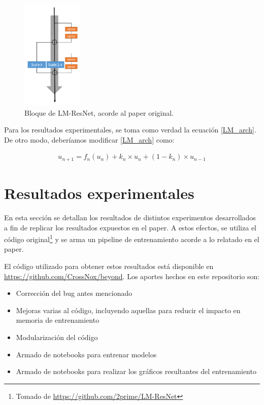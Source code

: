 \documentclass[titlepage,a4paper,oneside]{article}
\begin{document}
\begin{figure}[H]
\centering
\includegraphics[height=200px]{images/LM-Block-orig.png}
\caption{Bloque de LM-ResNet, acorde al paper original.}
\label{lmblockorig}
\end{figure}

Para los resultados experimentales, se toma como verdad la ecuación \ref{LM_arch}. De otro modo, deberíamos modificar \ref{LM_arch} como:

\begin{align}
	u_{n+1} = f_n(u_n) + k_n \times u_n + (1-k_n) \times u_{n-1}
\end{align}

\section{Resultados experimentales}
En esta sección se detallan los resultados de distintos experimentos desarrollados a fin de replicar los resultados expuestos en el paper. A estos efectos, se utiliza el código original\footnote{Tomado de \url{https://github.com/2prime/LM-ResNet}} y se arma un pipeline de entrenamiento acorde a lo relatado en el paper.

El código utilizado para obtener estos resultados está disponible en \url{https://github.com/CrossNox/beyond}. Los aportes hechos en este repositorio son:

\begin{itemize}
	\item Corrección del bug antes mencionado
	\item Mejoras varias al código, incluyendo aquellas para reducir el impacto en memoria de entrenamiento
	\item Modularización del código
	\item Armado de notebooks para entrenar modelos
	\item Armado de notebooks para realizar los gráficos resultantes del entrenamiento
\end{itemize}
\end{document}
